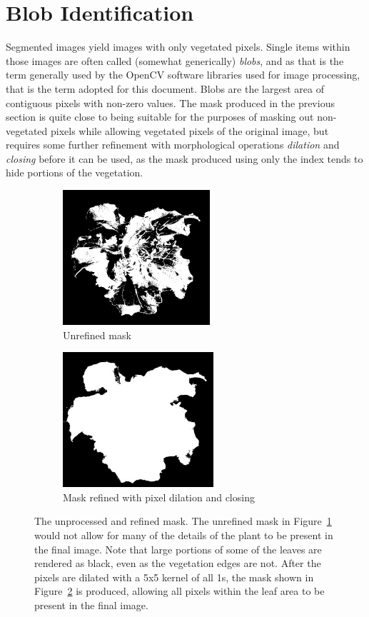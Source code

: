 \documentclass[letterpaper]{article}
\begin{document}
{{\section{Blob Identification}
Segmented images yield images with only vegetated pixels. Single items within those images are often called (somewhat generically) \textit{blobs}, and as that is the term generally used by the OpenCV software libraries used for image processing, that is the term adopted for this document. Blobs are the largest area of contiguous pixels with non-zero values.  The mask produced in the previous section is quite close to being suitable for the purposes of masking out non-vegetated pixels while allowing vegetated pixels of the original image, but requires some further refinement with morphological operations \textit{dilation} and \textit{closing} before it can be used, as the mask produced using only the index tends to hide portions of the vegetation.

\begin{figure}[h!]
	\centering
	\begin{subfigure}[h]{.48\textwidth}
	  \centering
	  \includegraphics[height=5cm]{./figures/mask-raw.jpg}
	  \caption{Unrefined mask}
	  \label{fig:mask-raw}
	\end{subfigure}
	\hfill
	\begin{subfigure}[h]{.48\textwidth}
	  \centering
	  \includegraphics[height=5cm]{./figures/mask-processed.jpg}
	  \caption{Mask refined with pixel dilation and closing}
	  \label{fig:mask-processed}
	\end{subfigure}
	\caption[Mask before and after morphological refinements]{The unprocessed and refined mask. The unrefined mask in Figure~\ref{fig:mask-raw} would not allow for many of the details of the plant to be present in the final image. Note that large portions of some of the leaves are rendered as black, even as the vegetation edges are not. After the pixels are dilated with a 5x5 kernel of all 1s, the mask shown in Figure~\ref{fig:mask-processed} is produced, allowing all pixels within the leaf area to be present in the final image.}
	\label{fig:mask-before-and-after}
\end{figure}


}}
\end{document}
